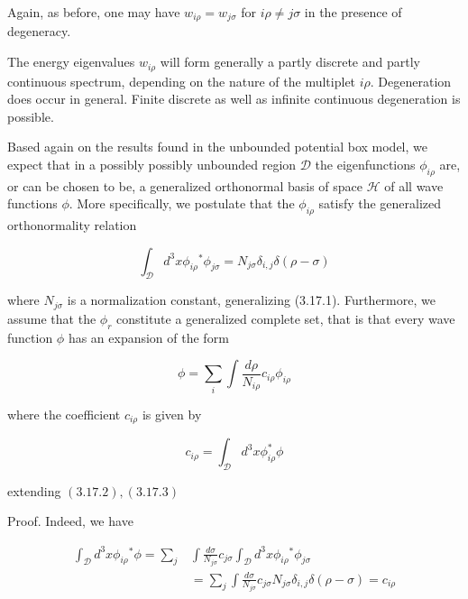 \documentclass{article}
\begin{document}
Again, as before, one may have $w_{i \rho}=w_{j \sigma}$ for $i \rho \neq j \sigma$ in the presence of degeneracy.

The energy eigenvalues $w_{i \rho}$ will form generally a partly discrete and partly continuous spectrum, depending on the nature of the multiplet $i \rho$. Degeneration does occur in general. Finite discrete as well as infinite continuous degeneration is possible.

Based again on the results found in the unbounded potential box model, we expect that in a possibly possibly unbounded region $\mathcal{D}$ the eigenfunctions $\phi_{i \rho}$ are, or can be chosen to be, a generalized orthonormal basis of space $\mathcal{H}$ of all wave functions $\phi$. More specifically, we postulate that the $\phi_{i \rho}$ satisfy the generalized orthonormality relation
 
\begin{equation*}
\int_{\mathcal{D}} d^{3} x \phi_{i \rho}{ }^{*} \phi_{j \sigma}=N_{j \sigma} \delta_{i, j} \delta(\rho-\sigma) \tag{3.17.20}
\end{equation*}
 
where $N_{j \sigma}$ is a normalization constant, generalizing (3.17.1). Furthermore, we assume that the $\phi_{r}$ constitute a generalized complete set, that is that every wave function $\phi$ has an expansion of the form
 
\begin{equation*}
\phi=\sum_{i} \int \frac{d \rho}{N_{i \rho}} c_{i \rho} \phi_{i \rho} \tag{3.17.21}
\end{equation*}
 
where the coefficient $c_{i \rho}$ is given by
 
\begin{equation*}
c_{i \rho}=\int_{\mathcal{D}} d^{3} x \phi_{i \rho}^{*} \phi \tag{3.17.22}
\end{equation*}
 
extending $(3.17 .2),(3.17 .3)$

Proof. Indeed, we have
 
\begin{align*}
\int_{\mathcal{D}} d^{3} x \phi_{i \rho}{ }^{*} \phi=\sum_{j} & \int \frac{d \sigma}{N_{j \sigma}} c_{j \sigma} \int_{\mathcal{D}} d^{3} x \phi_{i \rho}{ }^{*} \phi_{j \sigma}  \tag{3.17.23}\\
& =\sum_{j} \int \frac{d \sigma}{N_{j \sigma}} c_{j \sigma} N_{j \sigma} \delta_{i, j} \delta(\rho-\sigma)=c_{i \rho}
\end{align*}
 
\end{document}
